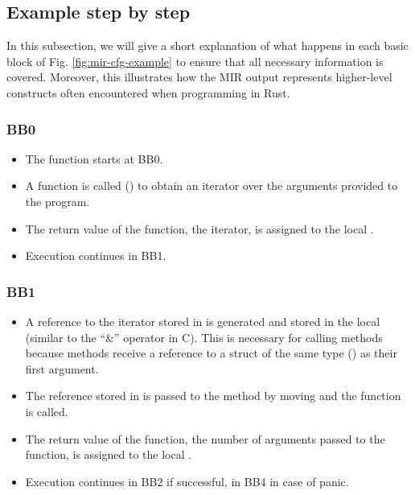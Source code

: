 \documentclass[../Thesis.tex]{subfiles}
\begin{document}
\subsection{Example step by step}

In this subsection, we will give a short explanation of what happens
in each basic block of Fig. \ref{fig:mir-cfg-example}
to ensure that all necessary information is covered.
Moreover, this illustrates how the MIR output represents higher-level constructs
often encountered when programming in Rust.

\subsubsection{BB0}

\begin{itemize}
    \item The  function starts at BB0.
    \item A function is called ()
          to obtain an iterator over the arguments provided to the program.
    \item The return value of the function, the iterator,
          is assigned to the local .
    \item Execution continues in BB1.
\end{itemize}

\subsubsection{BB1}

\begin{itemize}
    \item A reference to the iterator stored in  is generated
          and stored in the local  (similar to the ``\&'' operator in C).
          This is necessary for calling methods
          because methods receive a reference
          to a struct of the same type () as their first argument.
    \item The reference stored in  is passed to
          the method  by moving
          and the function is called.
    \item The return value of the function,
          the number of arguments passed to the function, is assigned to the local .
    \item Execution continues in BB2 if successful, in BB4 in case of panic.
\end{itemize}
\end{document}
